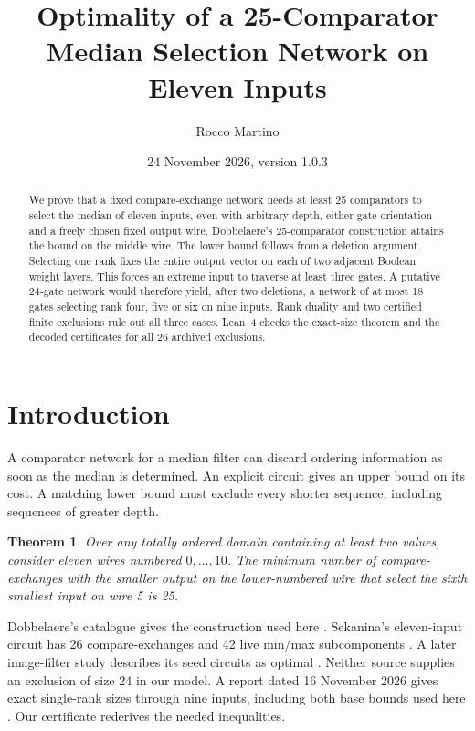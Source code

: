 \documentclass[11pt,reqno]{amsart}
\title[Optimal median selection on eleven inputs]{Optimality of a 25-Comparator Median Selection Network on Eleven Inputs}
\author{Rocco Martino}
\date{24 November 2026, version 1.0.3}
\newtheorem{theorem}{Theorem}[section]
\begin{document}
\begin{abstract}
We prove that a fixed compare-exchange network needs at least 25
comparators to select the median of eleven inputs, even with arbitrary
depth, either gate orientation and a freely chosen fixed output wire.
Dobbelaere's 25-comparator construction attains the bound on the middle
wire. The lower bound follows from a deletion argument. Selecting one
rank fixes the entire output vector on each of two adjacent Boolean
weight layers. This forces an extreme input to traverse at least three
gates. A putative 24-gate network would therefore yield, after two
deletions, a network of at most 18 gates selecting rank four, five or
six on nine inputs. Rank duality and two certified finite exclusions
rule out all three cases. Lean~4 checks the exact-size theorem and the
decoded certificates for all 26 archived exclusions.
\end{abstract}
\maketitle

\section{Introduction}
A comparator network for a median filter can discard ordering information
as soon as the median is determined. An explicit circuit gives an upper
bound on its cost. A matching lower bound must exclude every shorter
sequence, including sequences of greater depth.
\begin{theorem}\label{thm:main}
Over any totally ordered domain containing at least two values, consider
eleven wires numbered $0,\ldots,10$. The minimum number of
compare-exchanges with the smaller output on the lower-numbered wire
that select the sixth smallest input on wire 5 is 25.
\end{theorem}
Dobbelaere's catalogue gives the construction used here \cite{dobb}.
Sekanina's eleven-input circuit has 26 compare-exchanges and 42 live
min/max subcomponents \cite[Table 3]{sekanina}. A later image-filter
study describes its seed circuits as optimal \cite{filter}. Neither
source supplies an exclusion of size 24 in our model. A report dated
16 November 2026 gives exact single-rank sizes through nine inputs,
including both base bounds used here \cite{gsi}. Our certificate rederives
the needed inequalities.
\end{document}
